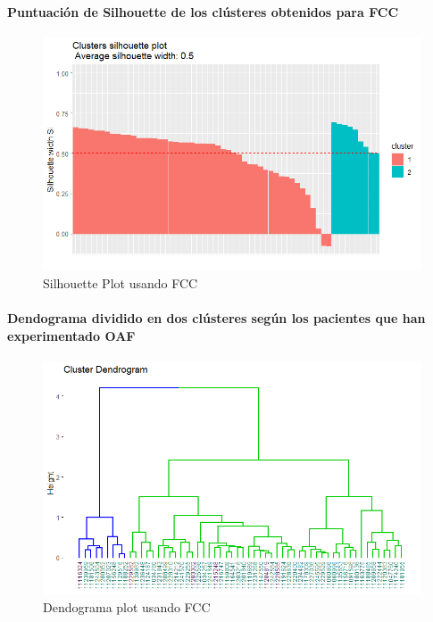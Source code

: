 \paragraph{Puntuación de Silhouette de los clústeres obtenidos para FCC}

\begin{figure}[H]
    \centering
    \includegraphics[scale = 0.8]{img/06-3-ccf.png}
    \caption{Silhouette Plot usando FCC}
    \label{fig:ccf_si}
\end{figure}

\paragraph{Dendograma dividido en dos clústeres según los pacientes que han experimentado OAF}

\begin{figure}[H]
    \centering
    \includegraphics[scale = 0.8]{img/06-4-ccf.png}
    \caption{Dendograma plot usando FCC}
    \label{fig:ccf_ctg}
\end{figure}

